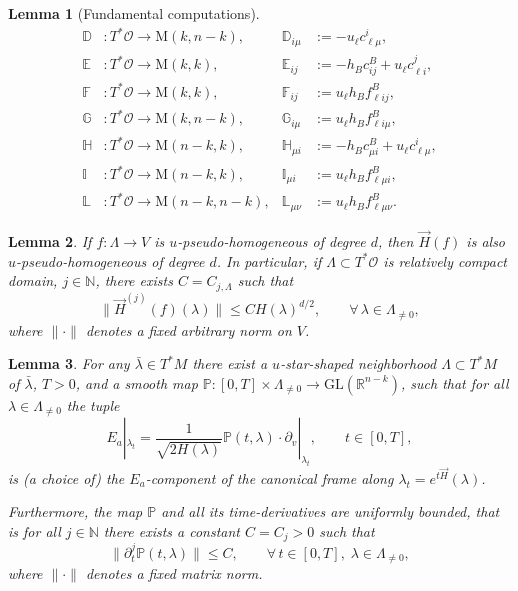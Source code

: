 \documentclass[10pt,a4paper]{amsart}
\newtheorem{lemma}{Lemma}
\newcommand{\D}{\mathbb{D}}
\newcommand{\E}{\mathbb{E}}
\newcommand{\F}{\mathbb{F}}
\newcommand{\G}{\mathbb{G}}
\renewcommand{\H}{\mathbb{H}}
\newcommand{\I}{\mathbb{I}}
\renewcommand{\L}{\mathbb{L}}
\newcommand{\N}{\mathbb{N}} %
\renewcommand{\P}{\mathbb{P}}
\newcommand{\R}{\mathbb{R}} %
\begin{document}
\begin{lemma}[Fundamental computations]
\begin{align}
\D & : T^*\mathcal{O} \to \mathrm{M}(k, n-k),& \D_{i \mu} & := - u_\ell c_{\ell \mu}^i, \\
\E & : T^*\mathcal{O} \to \mathrm{M}(k, k), & \E_{ij} & := -h_Bc_{ij}^B + u_\ell c_{\ell i}^j,   \\
\F & : T^*\mathcal{O} \to \mathrm{M}(k, k), & \F_{ij} & := u_\ell h_B f_{\ell i j}^B, \\
\G & : T^*\mathcal{O} \to \mathrm{M}(k, n-k),& \G_{i \mu} & := u_\ell h_B f_{\ell i \mu}^B, \\
\H & : T^*\mathcal{O} \to \mathrm{M}(n-k, k), & \H_{\mu i} & := - h_B c^{B}_{\mu i}+u_\ell c_{\ell \mu}^i,  \\
\I & : T^*\mathcal{O} \to \mathrm{M}(n-k, k), & \I_{\mu i} & :=  u_\ell h_B f_{\ell \mu i}^B, \\
\L & : T^*\mathcal{O} \to \mathrm{M}(n-k, n-k),& \L_{\mu \nu} & := u_\ell h_B f_{\ell \mu \nu}^B.
\end{align}
\end{lemma}

\begin{lemma}\label{l:property}
If $f:\Lambda \to V$ is $u$-pseudo-homogeneous of degree $d$, then $\vec{H}(f)$ is also $u$-pseudo-homogeneous of degree $d$. In particular, if $\Lambda\subset T^*\mathcal{O}$ is relatively compact domain, $j\in \N$, there exists $C=C_{j,\Lambda}$ such that
\begin{equation}
\|\vec{H}^{(j)}(f)(\lambda)\| \leq C H(\lambda)^{d/2}, \qquad \forall\, \lambda \in \Lambda_{\neq 0},
\end{equation}
where $\|\cdot\|$ denotes a fixed arbitrary norm on $V$.
\end{lemma}

\begin{lemma}\label{l:lemmaEa}
For any $\bar{\lambda}\in T^*M$ there exist a $u$-star-shaped neighborhood $\Lambda \subset T^*M$ of $\bar{\lambda}$, $T>0$, and a smooth map $\P: [0,T]\times \Lambda_{\neq 0} \to \mathrm{GL}(\R^{n-k})$, such that for all $\lambda \in \Lambda_{\neq 0}$ the tuple
\begin{equation}
E_a|_{\lambda_t} = \frac{1}{\sqrt{2H(\lambda)}}\P(t,\lambda) \cdot\partial_v|_{\lambda_t}, \qquad t\in[0,T],
\end{equation}
is (a choice of) the $E_a$-component of the canonical frame along $\lambda_t = e^{t\vec{H}}(\lambda)$.

Furthermore, the map $\P$ and all its time-derivatives are uniformly bounded, that is for all $j\in \N$ there exists a constant $C=C_j>0$ such that
\begin{equation}
\|\partial_t^{j}\P(t,\lambda)\| \leq C ,\qquad \forall\, t \in [0,T],\; \lambda \in \Lambda_{\neq 0},
\end{equation}
where $\|\cdot\|$ denotes a fixed matrix norm.
\end{lemma}
\end{document}
